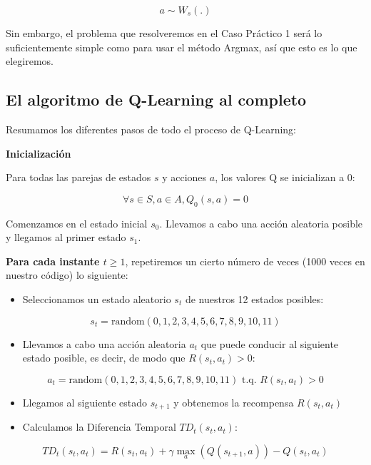 \documentclass[]{book}
\providecommand{\tightlist}{%
  \setlength{\itemsep}{0pt}\setlength{\parskip}{0pt}}
\begin{document}
\[a \sim W_s(.)\]

Sin embargo, el problema que resolveremos en el Caso Práctico 1 será lo suficientemente simple como para usar el método Argmax, así que esto es lo que elegiremos.

\hypertarget{el-algoritmo-de-q-learning-al-completo}{%
\subsection{El algoritmo de Q-Learning al completo}\label{el-algoritmo-de-q-learning-al-completo}}

Resumamos los diferentes pasos de todo el proceso de Q-Learning:

\textbf{Inicialización}

Para todas las parejas de estados \(s\) y acciones \(a\), los valores Q se inicializan a 0:

\[\forall s \in S, a \in A, Q_0(s,a) = 0\]

Comenzamos en el estado inicial \(s_0\). Llevamos a cabo una acción aleatoria posible y llegamos al primer estado \(s_1\).

\textbf{Para cada instante \(t \ge 1\)}, repetiremos un cierto número de veces (1000 veces en nuestro código) lo siguiente:

\begin{itemize}
\tightlist
\item
  Seleccionamos un estado aleatorio \(s_t\) de nuestros 12 estados posibles:
\end{itemize}

\[s_t = \textrm{random}(0,1,2,3,4,5,6,7,8,9,10,11)\]

\begin{itemize}
\tightlist
\item
  Llevamos a cabo una acción aleatoria \(a_t\) que puede conducir al siguiente estado posible, es decir, de modo que \(R(s_t,a_t) > 0\):
\end{itemize}

\[a_t = \textrm{random}(0,1,2,3,4,5,6,7,8,9,10,11) \textrm{ t.q. } R(s_t,a_t) > 0\]

\begin{itemize}
\item
  Llegamos al siguiente estado \(s_{t + 1}\) y obtenemos la recompensa \(R(s_t,a_t)\)
\item
  Calculamos la Diferencia Temporal \(TD_t(s_t,a_t)\):
\end{itemize}

\[TD_t(s_t,a_t) = R(s_t,a_t) + \gamma \underset{a}{\max}(Q(s_{t+1},a)) - Q(s_t, a_t)\]
\end{document}

